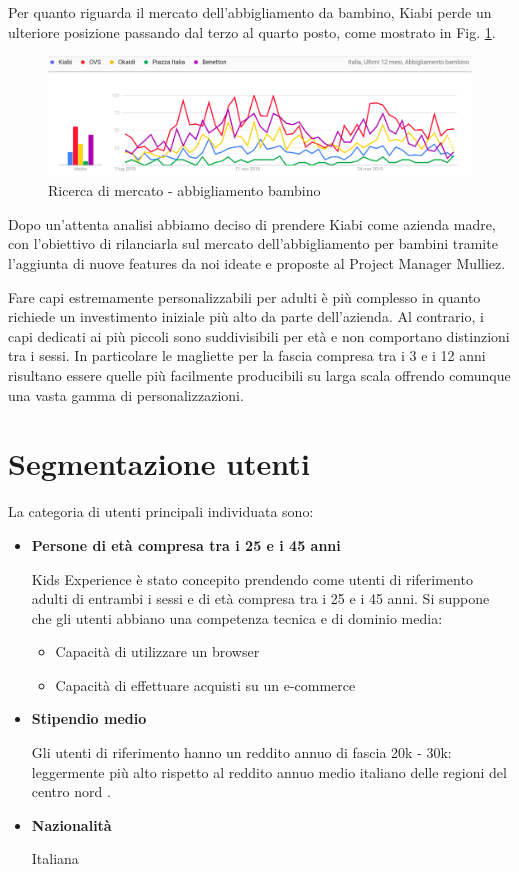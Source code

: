 \documentclass[12pt,italian,]{report}
\providecommand{\tightlist}{%
  \setlength{\itemsep}{0pt}\setlength{\parskip}{0pt}}
\begin{document}
Per quanto riguarda il mercato dell'abbigliamento da bambino, Kiabi perde un ulteriore posizione passando dal terzo al quarto posto, come mostrato in Fig. \ref{abbigliamento_bambino}.

\begin{figure}[h]
\centering
\includegraphics{img/abbigliamento_bambino.png}
\caption{Ricerca di mercato - abbigliamento bambino}
\label{abbigliamento_bambino}
\end{figure}

Dopo un'attenta analisi abbiamo deciso di prendere Kiabi come azienda madre, con l'obiettivo di rilanciarla sul mercato dell'abbigliamento per bambini tramite l'aggiunta di nuove features da noi ideate e proposte al Project Manager Mulliez.

Fare capi estremamente personalizzabili per adulti è più complesso in quanto richiede un investimento iniziale più alto da parte dell'azienda. Al contrario, i capi dedicati ai più piccoli sono suddivisibili per età e non comportano distinzioni tra i sessi. In particolare le magliette per la fascia compresa tra i 3 e i 12 anni risultano essere quelle più facilmente producibili su larga scala offrendo comunque una vasta gamma di personalizzazioni.

\section{Segmentazione utenti}\label{segmentazione_utenti}

La categoria di utenti principali individuata sono:

\begin{itemize}
\item
  \textbf{Persone di età compresa tra i 25 e i 45 anni}

  Kids Experience è stato concepito prendendo come utenti di riferimento
  adulti di entrambi i sessi e di età compresa tra i 25 e i 45 anni. Si
  suppone che gli utenti abbiano una competenza tecnica e di dominio
  media:

  \begin{itemize}
  \tightlist
  \item
    Capacità di utilizzare un browser
  \item
    Capacità di effettuare acquisti su un e-commerce
  \end{itemize}
\item
  \textbf{Stipendio medio}

  Gli utenti di riferimento hanno un reddito annuo di fascia 20k - 30k:
  leggermente più alto rispetto al reddito annuo medio italiano delle
  regioni del centro nord \cite{redditomedio}.
\item
  \textbf{Nazionalità}

  Italiana
\end{itemize}
\end{document}
